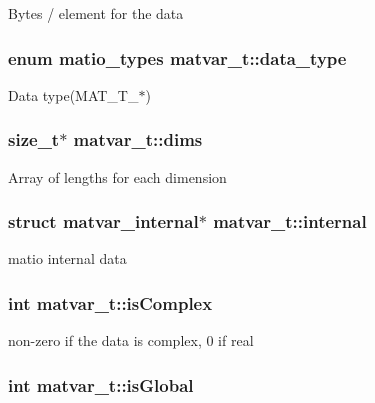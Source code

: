 \-Bytes / element for the data \hypertarget{structmatvar__t_ab6aafe9bd77f0f077852593dec438144}{
\subsubsection[{data\-\_\-type}]{\setlength{\rightskip}{0pt plus 5cm}enum {\bf matio\-\_\-types} {\bf matvar\-\_\-t\-::data\-\_\-type}}}\label{structmatvar__t_ab6aafe9bd77f0f077852593dec438144}
\-Data type(\-M\-A\-T\-\_\-\-T\-\_\-$\ast$) \hypertarget{structmatvar__t_a86a0006fff01d51e04d598d8fd48e619}{
\subsubsection[{dims}]{\setlength{\rightskip}{0pt plus 5cm}size\-\_\-t$\ast$ {\bf matvar\-\_\-t\-::dims}}}\label{structmatvar__t_a86a0006fff01d51e04d598d8fd48e619}
\-Array of lengths for each dimension \hypertarget{structmatvar__t_aa69173e24ef1ac2853548d763f97006c}{
\subsubsection[{internal}]{\setlength{\rightskip}{0pt plus 5cm}struct {\bf matvar\-\_\-internal}$\ast$ {\bf matvar\-\_\-t\-::internal}}}\label{structmatvar__t_aa69173e24ef1ac2853548d763f97006c}
matio internal data \hypertarget{structmatvar__t_aeb03b3a69f108dc05470b00443a43739}{
\subsubsection[{is\-Complex}]{\setlength{\rightskip}{0pt plus 5cm}int {\bf matvar\-\_\-t\-::is\-Complex}}}\label{structmatvar__t_aeb03b3a69f108dc05470b00443a43739}
non-\/zero if the data is complex, 0 if real \hypertarget{structmatvar__t_af26c71c4c0ddb14931d15910dddac1bc}{
\subsubsection[{is\-Global}]{\setlength{\rightskip}{0pt plus 5cm}int {\bf matvar\-\_\-t\-::is\-Global}}}\label{structmatvar__t_af26c71c4c0ddb14931d15910dddac1bc}
